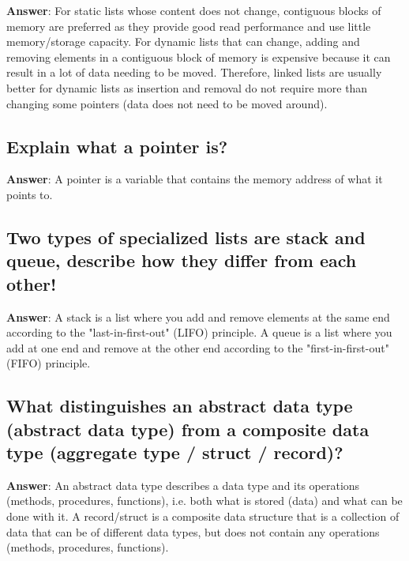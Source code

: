 \documentclass[a4paper,11pt,oneside]{article}
\begin{document}
\begin{sloppypar}
\label{q:262:sa:en:True}

\textbf{Answer}: For static lists whose content does not change, contiguous blocks of memory are preferred as they provide good read performance and use little memory/storage capacity. For dynamic lists that can change, adding and removing elements in a contiguous block of memory is expensive because it can result in a lot of data needing to be moved. Therefore, linked lists are usually better for dynamic lists as insertion and removal do not require more than changing some pointers (data does not need to be moved around).



\subsection{Explain what a pointer is?}

\label{q:263:sa:en:True}

\textbf{Answer}: A pointer is a variable that contains the memory address of what it points to.



\subsection{Two types of specialized lists are stack and queue, describe how they differ from each other!}

\label{q:264:sa:en:True}

\textbf{Answer}: A stack is a list where you add and remove elements at the same end according to the "last-in-first-out" (LIFO) principle. A queue is a list where you add at one end and remove at the other end according to the "first-in-first-out" (FIFO) principle.



\subsection{What distinguishes an abstract data type (abstract data type) from a composite data type (aggregate type / struct / record)?}

\label{q:265:sa:en:True}

\textbf{Answer}: An abstract data type describes a data type and its operations (methods, procedures, functions), i.e. both what is stored (data) and what can be done with it. A record/struct is a composite data structure that is a collection of data that can be of different data types, but does not contain any operations (methods, procedures, functions).




\end{sloppypar}
\end{document}
